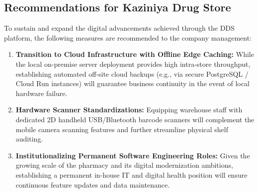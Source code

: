 \subsection{Recommendations for Kaziniya Drug Store}
To sustain and expand the digital advancements achieved through the DDS platform, the following measures are recommended to the company management:
\begin{enumerate}
    \item \textbf{Transition to Cloud Infrastructure with Offline Edge Caching:} While the local on-premise server deployment provides high intra-store throughput, establishing automated off-site cloud backups (e.g., via secure PostgreSQL / Cloud Run instances) will guarantee business continuity in the event of local hardware failure.
    \item \textbf{Hardware Scanner Standardizations:} Equipping warehouse staff with dedicated 2D handheld USB/Bluetooth barcode scanners will complement the mobile camera scanning features and further streamline physical shelf auditing.
    \item \textbf{Institutionalizing Permanent Software Engineering Roles:} Given the growing scale of the pharmacy and its digital modernization ambitions, establishing a permanent in-house IT and digital health position will ensure continuous feature updates and data maintenance.
\end{enumerate}

